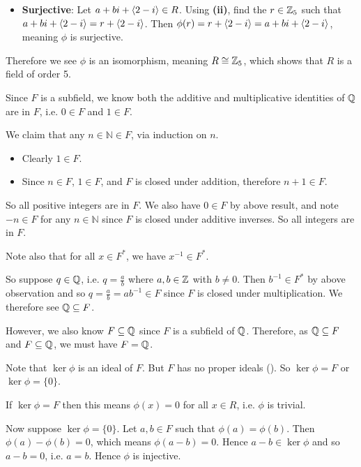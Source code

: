 \begin{questions}
\begin{partquestions}{\roman*}
\begin{itemize}
            \item \textbf{Surjective}: Let $a+bi + \left\langle2-i\right\rangle \in R$. Using \textbf{(ii)}, find the $r \in \mathbb{Z}_5$ such that $a+bi + \left\langle2-i\right\rangle = r + \left\langle2-i\right\rangle$. Then $\phi(r) = r + \left\langle2-i\right\rangle = a+bi + \left\langle2-i\right\rangle$, meaning $\phi$ is surjective.
        \end{itemize}
        Therefore we see $\phi$ is an isomorphism, meaning $R \cong \mathbb{Z}_5$, which shows that $R$ is a field of order 5.
    \end{partquestions}

    \item Since $F$ is a subfield, we know both the additive and multiplicative identities of $\mathbb{Q}$ are in $F$, i.e. $0 \in F$ and $1 \in F$.

    We claim that any $n \in \mathbb{N} \in F$, via induction on $n$.
    \begin{itemize}
        \item Clearly $1 \in F$.
        \item Since $n \in F$, $1 \in F$, and $F$ is closed under addition, therefore $n + 1 \in F$.
    \end{itemize}
    So all positive integers are in $F$. We also have $0 \in F$ by above result, and note $-n \in F$ for any $n \in \mathbb{N}$ since $F$ is closed under additive inverses. So all integers are in $F$.

    Note also that for all $x \in F^\ast$, we have $x^{-1} \in F^\ast$.

    So suppose $q \in \mathbb{Q}$, i.e. $q = \frac ab$ where $a, b \in \mathbb{Z}$ with $b \neq 0$. Then $b^{-1} \in F^\ast$ by above observation and so $q = \frac ab = ab^{-1} \in F$ since $F$ is closed under multiplication. We therefore see $\mathbb{Q} \subseteq F$.

    However, we also know $F \subseteq \mathbb{Q}$ since $F$ is a subfield of $\mathbb{Q}$. Therefore, as $\mathbb{Q} \subseteq F$ and $F \subseteq \mathbb{Q}$, we must have $F = \mathbb{Q}$.

    \item Note that $\ker\phi$ is an ideal of $F$. But $F$ has no proper ideals (). So $\ker\phi = F$ or $\ker\phi = \{0\}$.

    If $\ker\phi = F$ then this means $\phi(x) = 0$ for all $x\in R$, i.e. $\phi$ is trivial.

    Now suppose $\ker\phi = \{0\}$. Let $a, b \in F$ such that $\phi(a) = \phi(b)$. Then $\phi(a) - \phi(b) = 0$, which means $\phi(a - b) = 0$. Hence $a - b \in \ker\phi$ and so $a - b = 0$, i.e. $a = b$. Hence $\phi$ is injective.


\end{questions}
